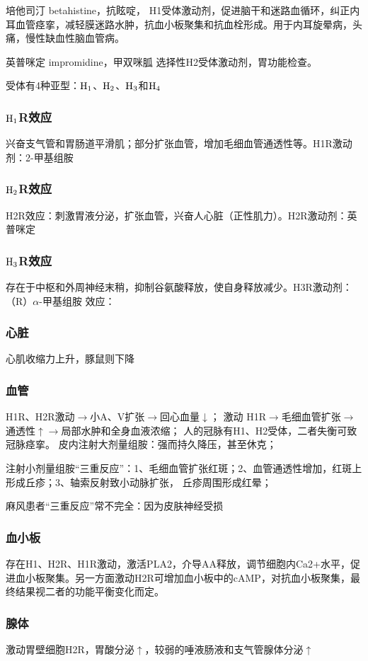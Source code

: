 \documentclass[UTF8]{ctexbook}
\begin{document}
培他司汀 betahistine，抗眩啶， H1受体激动剂，促进脑干和迷路血循环，纠正内耳血管痉挛，减轻膜迷路水肿，抗血小板聚集和抗血栓形成。用于内耳旋晕病，头痛，慢性缺血性脑血管病。

英普咪定 impromidine，甲双咪胍 选择性H2受体激动剂，胃功能检查。

受体有4种亚型：\(\textup{H}_{1}\)、\(\textup{H}_{2}\)、\(\textup{H}_{3}\)和\(\textup{H}_{4}\)
\subsubsection{\(\textup{H}_{1}\)R效应}
兴奋支气管和胃肠道平滑肌；部分扩张血管，增加毛细血管通透性等。H1R激动剂：2-甲基组胺
\subsubsection{\(\textup{H}_{2}\)R效应}
H2R效应：刺激胃液分泌，扩张血管，兴奋人心脏（正性肌力）。H2R激动剂：英普咪定
\subsubsection{\(\textup{H}_{3}\)R效应}
存在于中枢和外周神经末稍，抑制谷氨酸释放，使自身释放减少。H3R激动剂：（R）\(\alpha\)-甲基组胺
效应：

\subsubsection{心脏}
心肌收缩力上升，豚鼠则下降
\subsubsection{血管}
H1R、H2R激动\(\rightarrow\)小A、V扩张\(\rightarrow\)回心血量\(\downarrow\)；
激动 H1R\(\rightarrow\)毛细血管扩张\(\rightarrow\)通透性\(\uparrow\)\(\rightarrow\)局部水肿和全身血液浓缩；
人的冠脉有H1、H2受体，二者失衡可致冠脉痉挛。
皮内注射大剂量组胺：强而持久降压，甚至休克；

注射小剂量组胺“三重反应”：1、毛细血管扩张红斑；2、血管通透性增加，红斑上形成丘疹；3、轴索反射致小动脉扩张， 丘疹周围形成红晕；

麻风患者“三重反应”常不完全：因为皮肤神经受损
\subsubsection{血小板}
存在H1、H2R、H1R激动，激活PLA2，介导AA释放，调节细胞内Ca2+水平，促进血小板聚集。另一方面激动H2R可增加血小板中的cAMP，对抗血小板聚集，最终结果视二者的功能平衡变化而定。
\subsubsection{腺体}
激动胃壁细胞H2R，胃酸分泌\(\uparrow\)，较弱的唾液肠液和支气管腺体分泌\(\uparrow\)
\end{document}

